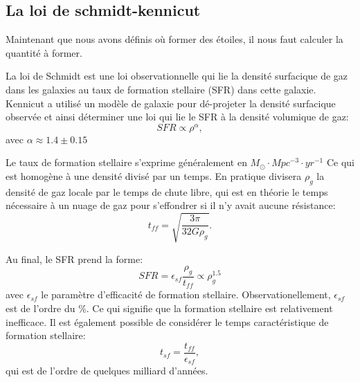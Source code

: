 
\subsection{La loi de schmidt-kennicut}

Maintenant que nous avons définis où former des étoiles, il nous faut calculer la quantité à former.

La loi de Schmidt \citep{1959ApJ...129..243S}  est une loi observationnelle qui lie la densité surfacique de gaz dans les galaxies au taux de formation stellaire (\ac{SFR}) dans cette galaxie.
Kennicut \citep{1998ApJ...498..541K} a utilisé un modèle de galaxie pour dé-projeter la densité surfacique observée et ainsi déterminer une loi qui lie le \ac{SFR} à la densité volumique de gaz:
\begin{equation}
SFR \propto \rho ^{\alpha},
\end{equation}
avec $\alpha \approx 1.4 \pm 0.15$

Le taux de formation stellaire s'exprime généralement en $M_\odot \cdot Mpc^{-3}  \cdot yr^{-1}$  
Ce qui est homogène à une densité divisé par un temps.
En pratique divisera $\rho_g$ la densité de gaz locale par le temps de chute libre, qui est en théorie le temps nécessaire à un nuage de gaz pour s'effondrer si il n'y avait aucune résistance:
\begin{equation}
t_{ff} = \sqrt{\frac{3\pi}{32G\rho_g}}.
\end{equation}

Au final, le \ac{SFR} prend la forme:
\begin{equation}
	SFR = \epsilon_{sf} \frac{\rho_g}{t_{ff}} \propto \rho_g^{1.5}
    \label{eq_sfr}
\end{equation}
avec  $\epsilon_{sf}$ le paramètre d'efficacité de formation stellaire.
Observationellement, $\epsilon_{sf}$  est de l'ordre du \%. %
Ce qui signifie que la formation stellaire est relativement inefficace.
Il est également possible de considérer le temps caractéristique de formation stellaire:
\begin{equation}
t_{sf} =  \frac{t_{ff}}{ \epsilon_{sf} },
\end{equation}
qui est de l'ordre de quelques milliard d'années.

